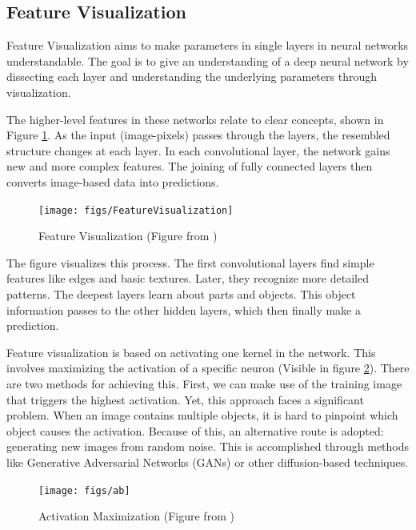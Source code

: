 \subsection{Feature Visualization}


Feature Visualization aims to make parameters in single layers in neural networks understandable. The goal is to give an understanding of a deep neural network by dissecting each layer and understanding the underlying parameters through visualization.

The higher-level features in these networks relate to clear concepts, shown in Figure \ref{fig:feature-visualization}. As the input (image-pixels) passes through the layers, the resembled structure changes at each layer. In each convolutional layer, the network gains new and more complex features. The joining of fully connected layers then converts image-based data into predictions.
\\
\begin{figure}[H]
	\centering
	\texttt{[image: figs/FeatureVisualization]}
	\caption[Feature Visualization]{Feature Visualization (Figure from \cite{olah2017feature})}
	\label{fig:feature-visualization}
\end{figure}

The figure visualizes this process. The first convolutional layers find simple features like edges and basic textures. Later, they recognize more detailed patterns. The deepest layers learn about parts and objects. This object information passes to the other hidden layers, which then finally make a prediction.

Feature visualization is based on activating one kernel in the network. This involves maximizing the activation of a specific neuron (Visible in figure \ref*{fig:optimization}). There are two methods for achieving this. First, we can make use of the training image that triggers the highest activation. Yet, this approach faces a significant problem. When an image contains multiple objects, it is hard to pinpoint which object causes the activation. Because of this, an alternative route is adopted: generating new images from random noise. This is accomplished through methods like Generative Adversarial Networks (GANs) \cite{goodfellow2014generative} or other diffusion-based techniques\cite{zhang2023survey}.

\begin{figure}[H]
	\centering
	\texttt{[image: figs/ab]}
	\caption[Activation Maximization]{Activation Maximization (Figure from \cite{olah2017feature})}
	\label{fig:optimization}
\end{figure}

